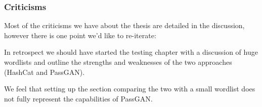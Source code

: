 \documentclass{beamer}
\begin{document}
\begin{frame}
\frametitle{Criticisms}
Most of the criticisms we have about the thesis are detailed in the discussion, however there is one point we'd like to re-iterate:

In retrospect we should have started the testing chapter with a discussion of huge wordlists and outline the strengths and weaknesses of the two approaches (HashCat and PassGAN).

We feel that setting up the section comparing the two with a small wordlist does not fully represent the capabilities of PassGAN.
\end{frame}    
\end{document}
